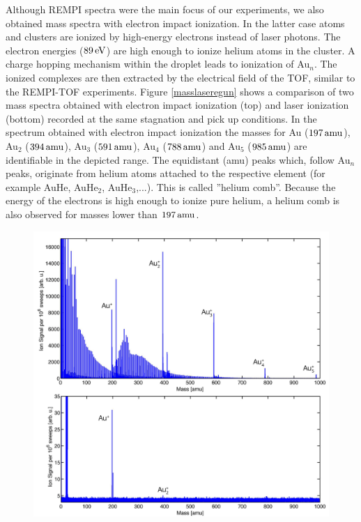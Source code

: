 \documentclass[parskip,12pt,headsepline,a4paper] {scrbook}
\begin{document}
Although REMPI spectra were the main focus of our experiments, we also obtained mass spectra with electron impact ionization. In the latter case atoms and clusters are ionized by high-energy electrons instead of laser photons. The electron energies ($\unit[89]{eV}$) are high enough to ionize helium atoms in the cluster. A charge hopping mechanism within the droplet leads to ionization of Au$_n$. The ionized complexes are then extracted by the electrical field of the TOF, similar to the REMPI-TOF experiments. Figure \ref{masslaseregun} shows a comparison of two mass spectra obtained with electron impact ionization (top) and laser ionization (bottom) recorded at the same stagnation and pick up conditions. In the spectrum obtained with electron impact ionization the masses for Au ($\unit[197]{amu}$), Au$_2$ ($\unit[394]{amu}$), Au$_3$ ($\unit[591]{amu}$), Au$_4$ ($\unit[788]{amu}$) and Au$_5$ ($\unit[985]{amu}$) are identifiable in the depicted range. The equidistant (\unit[4]{amu}) peaks which, follow Au$_n$ peaks, originate from helium atoms attached to the respective element (for example AuHe, AuHe$_2$, AuHe$_3$,...). This is called ''helium comb''. Because the energy of the electrons is high enough to ionize pure helium, a helium comb is also observed for masses lower than $\unit[197]{amu}$.

\begin{figure}[ht]
\centerline{
\includegraphics[width=16cm]{./results/mass_egun_laser.jpg}}
\end{figure}
\end{document}
